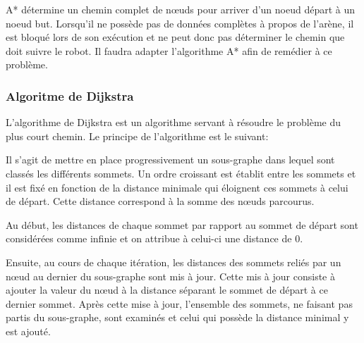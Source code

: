 A* détermine un chemin complet de nœuds pour arriver d'un noeud départ à un noeud but. Lorsqu'il ne possède pas de données complètes à propos de l'arène, il est bloqué lors de son exécution et ne peut donc pas déterminer le chemin que doit suivre le robot. Il faudra adapter l'algorithme A* afin de remédier à ce problème.

\subsubsection{Algoritme de Dijkstra}
\cite{wikiDijkstra}

L’algorithme de Dijkstra est un algorithme servant à résoudre le problème du plus court chemin. Le principe de l'algorithme est le suivant:

Il s'agit de mettre en place progressivement un sous-graphe dans lequel sont classés les différents sommets. Un ordre croissant est établit entre les sommets et il est fixé en fonction de la distance minimale qui éloignent ces sommets à celui de départ. Cette distance correspond à la somme des nœuds parcourus.

Au début, les distances de chaque sommet par rapport au sommet de départ sont considérées comme infinie et on attribue à celui-ci une distance de 0.

Ensuite, au cours de chaque itération, les distances des sommets reliés par un nœud au dernier du sous-graphe sont mis à jour. Cette mis à jour consiste à ajouter la valeur du nœud à la distance séparant le sommet de départ à ce dernier sommet. Après cette mise à jour, l'ensemble des sommets, ne faisant pas partis du sous-graphe, sont examinés et celui qui possède la distance minimal y est ajouté.

